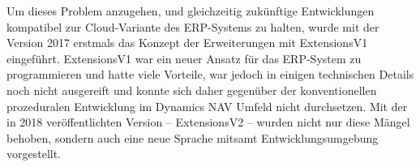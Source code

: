 Um dieses Problem anzugehen, und gleichzeitig zukünftige Entwicklungen kompatibel zur Cloud-Variante des ERP-Systems zu halten, wurde mit der Version 2017 erstmals das Konzept der Erweiterungen mit ExtensionsV1 eingeführt. ExtensionsV1 war ein neuer Ansatz für das ERP-System zu programmieren und hatte viele Vorteile, war jedoch in einigen technischen Details noch nicht ausgereift und konnte sich daher gegenüber der konventionellen prozeduralen Entwicklung im Dynamics NAV Umfeld nicht durchsetzen. 
Mit der in 2018 veröffentlichten Version -- ExtensionsV2 -- wurden nicht nur diese Mängel behoben, sondern auch eine neue Sprache mitsamt Entwicklungsumgebung vorgestellt.





